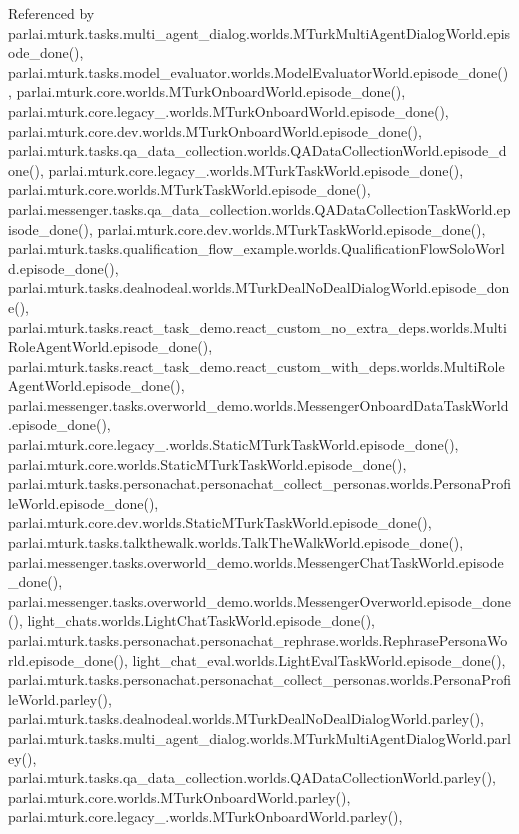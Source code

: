 Referenced by parlai.\+mturk.\+tasks.\+multi\+\_\+agent\+\_\+dialog.\+worlds.\+M\+Turk\+Multi\+Agent\+Dialog\+World.\+episode\+\_\+done(), parlai.\+mturk.\+tasks.\+model\+\_\+evaluator.\+worlds.\+Model\+Evaluator\+World.\+episode\+\_\+done(), parlai.\+mturk.\+core.\+worlds.\+M\+Turk\+Onboard\+World.\+episode\+\_\+done(), parlai.\+mturk.\+core.\+legacy\+\_.\+worlds.\+M\+Turk\+Onboard\+World.\+episode\+\_\+done(), parlai.\+mturk.\+core.\+dev.\+worlds.\+M\+Turk\+Onboard\+World.\+episode\+\_\+done(), parlai.\+mturk.\+tasks.\+qa\+\_\+data\+\_\+collection.\+worlds.\+Q\+A\+Data\+Collection\+World.\+episode\+\_\+done(), parlai.\+mturk.\+core.\+legacy\+\_.\+worlds.\+M\+Turk\+Task\+World.\+episode\+\_\+done(), parlai.\+mturk.\+core.\+worlds.\+M\+Turk\+Task\+World.\+episode\+\_\+done(), parlai.\+messenger.\+tasks.\+qa\+\_\+data\+\_\+collection.\+worlds.\+Q\+A\+Data\+Collection\+Task\+World.\+episode\+\_\+done(), parlai.\+mturk.\+core.\+dev.\+worlds.\+M\+Turk\+Task\+World.\+episode\+\_\+done(), parlai.\+mturk.\+tasks.\+qualification\+\_\+flow\+\_\+example.\+worlds.\+Qualification\+Flow\+Solo\+World.\+episode\+\_\+done(), parlai.\+mturk.\+tasks.\+dealnodeal.\+worlds.\+M\+Turk\+Deal\+No\+Deal\+Dialog\+World.\+episode\+\_\+done(), parlai.\+mturk.\+tasks.\+react\+\_\+task\+\_\+demo.\+react\+\_\+custom\+\_\+no\+\_\+extra\+\_\+deps.\+worlds.\+Multi\+Role\+Agent\+World.\+episode\+\_\+done(), parlai.\+mturk.\+tasks.\+react\+\_\+task\+\_\+demo.\+react\+\_\+custom\+\_\+with\+\_\+deps.\+worlds.\+Multi\+Role\+Agent\+World.\+episode\+\_\+done(), parlai.\+messenger.\+tasks.\+overworld\+\_\+demo.\+worlds.\+Messenger\+Onboard\+Data\+Task\+World.\+episode\+\_\+done(), parlai.\+mturk.\+core.\+legacy\+\_.\+worlds.\+Static\+M\+Turk\+Task\+World.\+episode\+\_\+done(), parlai.\+mturk.\+core.\+worlds.\+Static\+M\+Turk\+Task\+World.\+episode\+\_\+done(), parlai.\+mturk.\+tasks.\+personachat.\+personachat\+\_\+collect\+\_\+personas.\+worlds.\+Persona\+Profile\+World.\+episode\+\_\+done(), parlai.\+mturk.\+core.\+dev.\+worlds.\+Static\+M\+Turk\+Task\+World.\+episode\+\_\+done(), parlai.\+mturk.\+tasks.\+talkthewalk.\+worlds.\+Talk\+The\+Walk\+World.\+episode\+\_\+done(), parlai.\+messenger.\+tasks.\+overworld\+\_\+demo.\+worlds.\+Messenger\+Chat\+Task\+World.\+episode\+\_\+done(), parlai.\+messenger.\+tasks.\+overworld\+\_\+demo.\+worlds.\+Messenger\+Overworld.\+episode\+\_\+done(), light\+\_\+chats.\+worlds.\+Light\+Chat\+Task\+World.\+episode\+\_\+done(), parlai.\+mturk.\+tasks.\+personachat.\+personachat\+\_\+rephrase.\+worlds.\+Rephrase\+Persona\+World.\+episode\+\_\+done(), light\+\_\+chat\+\_\+eval.\+worlds.\+Light\+Eval\+Task\+World.\+episode\+\_\+done(), parlai.\+mturk.\+tasks.\+personachat.\+personachat\+\_\+collect\+\_\+personas.\+worlds.\+Persona\+Profile\+World.\+parley(), parlai.\+mturk.\+tasks.\+dealnodeal.\+worlds.\+M\+Turk\+Deal\+No\+Deal\+Dialog\+World.\+parley(), parlai.\+mturk.\+tasks.\+multi\+\_\+agent\+\_\+dialog.\+worlds.\+M\+Turk\+Multi\+Agent\+Dialog\+World.\+parley(), parlai.\+mturk.\+tasks.\+qa\+\_\+data\+\_\+collection.\+worlds.\+Q\+A\+Data\+Collection\+World.\+parley(), parlai.\+mturk.\+core.\+worlds.\+M\+Turk\+Onboard\+World.\+parley(), parlai.\+mturk.\+core.\+legacy\+\_.\+worlds.\+M\+Turk\+Onboard\+World.\+parley(), 